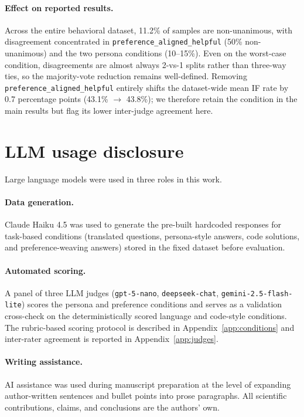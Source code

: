 \paragraph{Effect on reported results.}
Across the entire behavioral dataset, 11.2\% of samples are non-unanimous, with disagreement concentrated in \texttt{preference\_aligned\_helpful} (50\% non-unanimous) and the two persona conditions (10--15\%). Even on the worst-case condition, disagreements are almost always 2-vs-1 splits rather than three-way ties, so the majority-vote reduction remains well-defined. Removing \texttt{preference\_aligned\_helpful} entirely shifts the dataset-wide mean IF rate by 0.7 percentage points (43.1\% $\to$ 43.8\%); we therefore retain the condition in the main results but flag its lower inter-judge agreement here.


\section{LLM usage disclosure}
\label{app:llm-disclosure}

Large language models were used in three roles in this work.

\paragraph{Data generation.} Claude Haiku 4.5 was used to generate the pre-built hardcoded responses for task-based conditions (translated questions, persona-style answers, code solutions, and preference-weaving answers) stored in the fixed dataset before evaluation.

\paragraph{Automated scoring.} A panel of three LLM judges (\texttt{gpt-5-nano}, \texttt{deepseek-chat}, \texttt{gemini-2.5-flash-lite}) scores the persona and preference conditions and serves as a validation cross-check on the deterministically scored language and code-style conditions. The rubric-based scoring protocol is described in Appendix~\ref{app:conditions} and inter-rater agreement is reported in Appendix~\ref{app:judges}.

\paragraph{Writing assistance.} AI assistance was used during manuscript preparation at the level of expanding author-written sentences and bullet points into prose paragraphs. All scientific contributions, claims, and conclusions are the authors' own.
